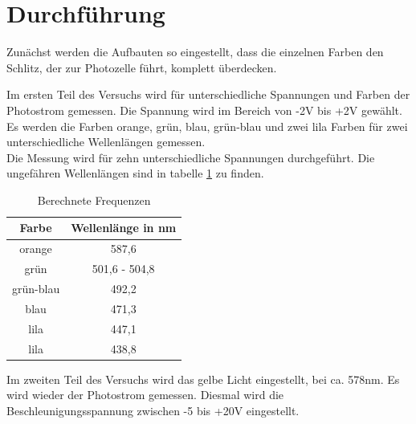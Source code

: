   \section{Durchführung}
Zunächst werden die Aufbauten so eingestellt,
dass die einzelnen Farben den Schlitz, der zur Photozelle führt, komplett überdecken.

  Im ersten Teil des Versuchs wird für unterschiedliche Spannungen
  und Farben der Photostrom gemessen.
  Die Spannung wird im Bereich von -2V bis +2V gewählt.
  Es werden die Farben orange, grün, blau, grün-blau
  und zwei lila Farben für zwei unterschiedliche Wellenlängen gemessen.\\
  Die Messung wird für zehn unterschiedliche Spannungen durchgeführt.
Die ungefähren Wellenlängen sind in tabelle \ref{tab:wel} zu finden.
\begin{table}
\centering
\caption{Berechnete Frequenzen}
\label{tab:wel}
\begin{tabular}{c c }
\toprule
{Farbe} & {Wellenlänge in nm} \\
\midrule
orange & 587,6 \\
grün & 501,6 - 504,8 \\
grün-blau & 492,2 \\
blau & 471,3 \\
lila & 447,1 \\
lila & 438,8\\
\bottomrule
\end{tabular}
\end{table}

  Im zweiten Teil des Versuchs wird das gelbe Licht eingestellt,
  bei ca. 578nm.
  Es wird wieder der Photostrom gemessen.
  Diesmal wird die Beschleunigungsspannung zwischen -5 bis +20V eingestellt.
